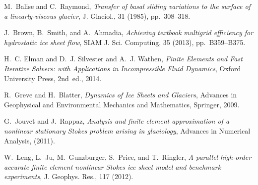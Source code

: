 \documentclass[letterpaper,final,12pt,reqno]{amsart}
\begin{document}
\begin{thebibliography}{6}

{\sc M.~Balise and C.~Raymond}, {\em Transfer of basal sliding variations to
  the surface of a linearly-viscous glacier}, J. Glaciol., 31 (1985),
  pp.~308--318.

{\sc J.~Brown, B.~Smith, and A.~Ahmadia}, {\em Achieving textbook multigrid
  efficiency for hydrostatic ice sheet flow}, SIAM J. Sci. Computing,
  35 (2013), pp.~B359--B375.

{\sc H.~C. Elman and D.~J. Silvester and A.~J. Wathen}, {\em Finite Elements
  and Fast Iterative Solvers: with Applications in Incompressible Fluid Dynamics},
  Oxford University Press, 2nd~ed., 2014.

{\sc R.~Greve and H.~Blatter}, {\em Dynamics of {I}ce {S}heets and {G}laciers},
  Advances in Geophysical and Environmental Mechanics and Mathematics,
  Springer, 2009.

{\sc G.~Jouvet and J.~Rappaz}, {\em Analysis and finite element approximation
  of a nonlinear stationary {S}tokes problem arising in glaciology}, Advances
  in Numerical Analysis, (2011).

{\sc W.~Leng, L.~Ju, M.~Gunzburger, S.~Price, and T.~Ringler}, {\em A parallel
  high-order accurate finite element nonlinear {S}tokes ice sheet model and
  benchmark experiments}, J. Geophys. Res., 117 (2012).

\end{thebibliography}
\end{document}

